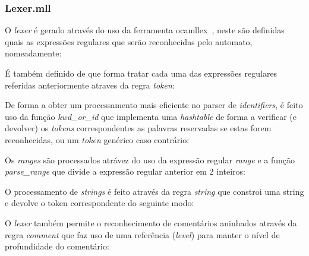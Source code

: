 \subsubsection{Lexer.mll}
\label{sec2:subsubsec:lexer}

O \textit{lexer} é gerado através do uso da ferramenta ocamllex~\cite{ocamllex}, neste são definidas quais as expressões regulares que serão reconhecidas pelo automato, nomeadamente:


\clearpage

É também definido de que forma tratar cada uma das expressões regulares referidas anteriormente atraves da regra \textit{token}:


\clearpage

De forma a obter um processamento mais eficiente no parser de \textit{identifiers}, é feito uso da função \textit{kwd\_or\_id} que implementa uma \textit{hashtable} de forma a verificar (e devolver) os \textit{tokens} correspondentes as palavras reservadas se estas forem reconhecidas, ou um \textit{token} genérico caso contrário:



Os \textit{ranges} são processados atrávez do uso da expressão regular \textit{range} e a função \textit{parse\_range} que divide a expressão regular anterior em 2 inteiros:


\clearpage

O processamento de \textit{strings} é feito através da regra \textit{string} que constroi uma string e devolve o token correspondente do seguinte modo:



O \textit{lexer} também permite o reconhecimento de comentários aninhados através da regra \textit{comment} que faz uso de uma referência (\textit{level}) para manter o nível de profundidade do comentário:


